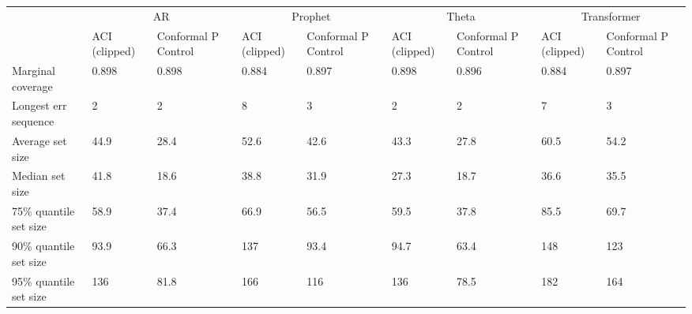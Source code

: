 \begin{tabular}{lllllllll}
\toprule
& \multicolumn{2}{c}{AR}& \multicolumn{2}{c}{Prophet}& \multicolumn{2}{c}{Theta}& \multicolumn{2}{c}{Transformer} \\
& ACI (clipped) & Conformal P Control & ACI (clipped) & Conformal P Control & ACI (clipped) & Conformal P Control & ACI (clipped) & Conformal P Control \\
\midrule
Marginal coverage & 0.898 & 0.898 & 0.884 & 0.897 & 0.898 & 0.896 & 0.884 & 0.897 \\
Longest err sequence & 2 & 2 & 8 & 3 & 2 & 2 & 7 & 3 \\
Average set size & 44.9 & 28.4 & 52.6 & 42.6 & 43.3 & 27.8 & 60.5 & 54.2 \\
Median set size & 41.8 & 18.6 & 38.8 & 31.9 & 27.3 & 18.7 & 36.6 & 35.5 \\
75\% quantile set size & 58.9 & 37.4 & 66.9 & 56.5 & 59.5 & 37.8 & 85.5 & 69.7 \\
90\% quantile set size & 93.9 & 66.3 & 137 & 93.4 & 94.7 & 63.4 & 148 & 123 \\
95\% quantile set size & 136 & 81.8 & 166 & 116 & 136 & 78.5 & 182 & 164 \\
\bottomrule
\end{tabular}
